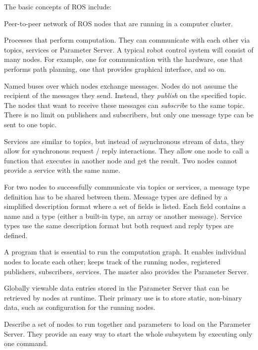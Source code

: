 \documentclass[english,inz,shortabstract]{iithesis}
\begin{document}
	The basic concepts of ROS include:
	\begin{description}[style=nextline]
		\item [Computation graph] \hfill
		Peer-to-peer network of ROS nodes that are running in a computer cluster.
		\item [Nodes] 
		Processes that perform computation. They can communicate with each other via topics, services or Parameter Server. A typical robot control system will consist of many nodes. For example, one for communication with the hardware, one that performs path planning, one that provides graphical interface, and so on.
		\item [Topics] 
		Named buses over which nodes exchange messages. Nodes do not assume the recipient of the messages they send. Instead, they \textit{publish} on the specified topic. The nodes that want to receive these messages can \textit{subscribe} to the same topic. There is no limit on publishers and subscribers, but only one message type can be sent to one topic.
		\item [Services] 
		Services are similar to topics, but instead of asynchronous stream of data, they allow for synchronous request / reply interactions. They allow one node to call a function that executes in another node and get the result. Two nodes cannot provide a service with the same name.
		\item [Message types]
		For two nodes to successfully communicate via topics or services, a message type definition has to be shared between them. Message types are defined by a simplified description format where a set of fields is listed. Each field contains a name and a type (either a built-in type, an array or another message). Service types use the same description format but both request and reply types are defined.
		\item [Master]
		A program that is essential to run the computation graph. It enables individual nodes to locate each other; keeps track of the running nodes, registered publishers, subscribers, services. The master also provides the Parameter Server.  
		\item [Parameters]
		Globally viewable data entries stored in the Parameter Server that can be retrieved by nodes at runtime. Their primary use is to store static, non-binary data, such as configuration for the running nodes.
		\item [Launch files]
		Describe a set of nodes to run together and parameters to load on the Parameter Server. They provide an easy way to start the whole subsystem by executing only one command. 

\end{description}
\end{document}
